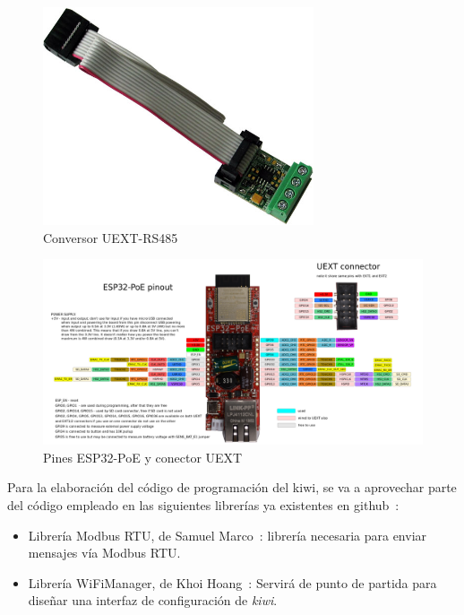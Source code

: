 \begin{figure}[H]
  \centering
  \includegraphics[width=8cm, keepaspectratio]{img/UEXT-RS485}
  \caption{Conversor UEXT-RS485}
  \label{figura:imgconversoruext}
\end{figure}

\hspace{1em}

\begin{figure}[H]
  \centering
  \includegraphics[width=\textwidth, keepaspectratio]{img/ESP32-POE-GPIO}
  \caption{Pines ESP32-PoE y conector UEXT}
  \label{figura:pinesesp32}
\end{figure}

Para la elaboración del código de programación del kiwi, se va a aprovechar parte del código empleado en las siguientes librerías ya existentes en github~\cite{githubweb}:

\begin{itemize}
  \item Librería Modbus RTU, de Samuel Marco~\cite{libreriaRTUgithub}: librería necesaria para enviar mensajes vía Modbus RTU. 
  \item Librería WiFiManager, de Khoi Hoang~\cite{libreriaWiFigithub}: Servirá de punto de partida para diseñar una interfaz de configuración de \textit{kiwi}.
\end{itemize}

